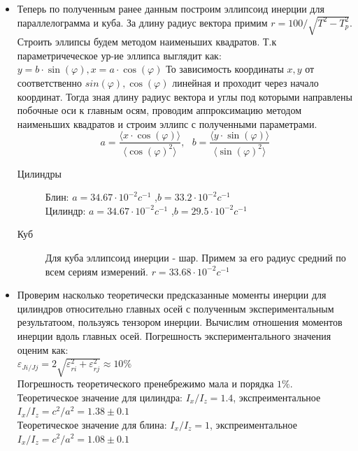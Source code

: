 \documentclass[a4paper, 10pt]{article}%
\begin{document}
\begin{itemize}
\item Теперь по полученным ранее данным построим эллипсоид инерции для параллелограмма и куба. За длину радиус вектора примим
$r=100/\sqrt{T^2-T^2_{p}}$. Строить эллипсы будем методом наименьших квадратов. Т.к параметричеческое ур-ие эллипса выглядит как:\\
$y=b \cdot \sin(\varphi), x= a \cdot \cos(\varphi)$ То зависимость координаты $x,y$ от соответственно $sin(\varphi),\cos(\varphi)$ линейная и
проходит через начало координат. Тогда зная 
длину радиус вектора и углы под которыми направлены побочные оси к главным осям, проводим аппроксимацию методом наименьших квадратов
 и строим эллипс с полученными параметрами.
$$a=\frac{\langle x \cdot \cos(\varphi)\rangle }{\langle \cos(\varphi)^2 \rangle }, \ \ \ b=\frac{\langle y \cdot \sin(\varphi)\rangle }{\langle \sin(\varphi)^2 \rangle }$$
\begin{description}
    \item[Цилиндры]Блин: $a = 34.67 \cdot 10^{-2}c^{-1}$ ,$b = 33.2 \cdot 10^{-2}c^{-1}$\\
Цилиндр: $a = 34.67  \cdot 10^{-2}c^{-1}$ ,$b = 29.5 \cdot 10^{-2}c^{-1}$
    \item[Куб] Для куба эллипсоид инерции - шар. Примем за его радиус средний по
всем сериям измерений. $r = 33.68 \cdot 10^{-2}c^{-1}$
\end{description}
\item Проверим насколько теоретически предсказанные моменты инерции для цилиндров относительно
главных осей с полученным экспериментальным результатоом, пользуясь тензором инерции.
Вычислим отношения моментов инерции вдоль главных осей. Погрешность экспериментального значения оценим как:\\
$\varepsilon_{Ji/Jj}=2\sqrt{\varepsilon^2_{ri}+\varepsilon^2_{rj}} \approx 10 \%$\\
Погрешность теоретического пренебрежимо мала и порядка $1\%$.\\
Теоретическое значение для цилиндра: $I_{x}/I_{z}= 1.4$, экспреиментальное $I_{x}/I_{z}=c^2/a^2=1.38 \pm 0.1$\\
Теоретическое значение для блина: $I_{x}/I_{z}= 1$, экспреиментальное $I_{x}/I_{z}=c^2/a^2=1.08 \pm 0.1$\\

\end{itemize}
\end{document}
